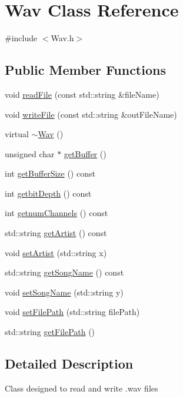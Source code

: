 \hypertarget{classWav}{}\section{Wav Class Reference}
\label{classWav}


{\ttfamily \#include $<$Wav.\+h$>$}

\subsection*{Public Member Functions}
\begin{DoxyCompactItemize}
\item 
void \hyperlink{classWav_a1c4230cec49d30147a5b8a1950083f7c}{read\+File} (const std\+::string \&file\+Name)
\item 
void \hyperlink{classWav_ad86f4a21d36719ae375ea2586f9f591f}{write\+File} (const std\+::string \&out\+File\+Name)
\item 
virtual \hyperlink{classWav_a1510b246ba121b103a60b8e7839af25f}{$\sim$\+Wav} ()
\item 
unsigned char $\ast$ \hyperlink{classWav_a2daf07a90ed34789e3a1874973d9bd36}{get\+Buffer} ()
\item 
int \hyperlink{classWav_a71fdfa1d9f5e7c1b86f07bbff4249dca}{get\+Buffer\+Size} () const
\item 
int \hyperlink{classWav_ac09aa7f7d656a42bffdfafa737c0bce8}{getbit\+Depth} () const
\item 
int \hyperlink{classWav_a3be0de234388ed90f2039bf193214c02}{getnum\+Channels} () const
\item 
std\+::string \hyperlink{classWav_ab7049943bab3ee9bf8c6ca4043989f3c}{get\+Artist} () const
\item 
void \hyperlink{classWav_acf8f0bbb6e0791d1f0c083c6700e0607}{set\+Artist} (std\+::string x)
\item 
std\+::string \hyperlink{classWav_a8de3a1bd3cc70540869a2a42ace98022}{get\+Song\+Name} () const
\item 
void \hyperlink{classWav_a129cd26f79a06e932e5cefda0ecdb35a}{set\+Song\+Name} (std\+::string y)
\item 
void \hyperlink{classWav_aa05dac85e219a94afc6a6f38530306ce}{set\+File\+Path} (std\+::string file\+Path)
\item 
std\+::string \hyperlink{classWav_a2a0cddb7e39fa964ef46737fcfcb9372}{get\+File\+Path} ()
\end{DoxyCompactItemize}


\subsection{Detailed Description}
Class designed to read and write .wav files 

